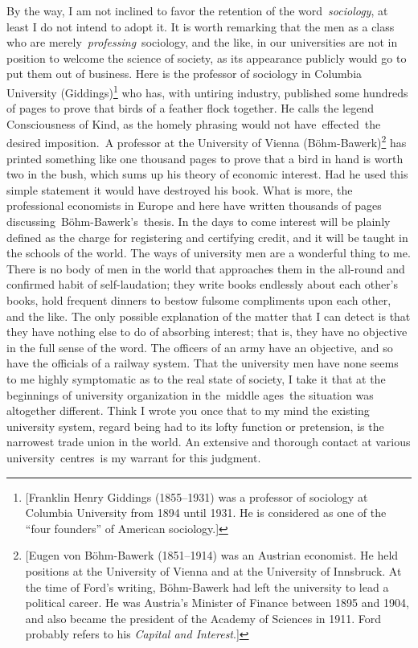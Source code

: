 \documentclass[twoside,symmetric,nobib,justified]{tufte-book}
\begin{document}
By the way, I am not inclined to favor the retention of the
word~\emph{sociology}, at least I do not intend to adopt it. It is worth
remarking that the men as a class who are
merely~\emph{professing}~sociology, and the like, in our universities
are not in position to welcome the science of society, as its appearance
publicly would go to put them out of business. Here is the professor of
sociology in Columbia University (Giddings)\footnote{{[}Franklin Henry
  Giddings (1855--1931) was a professor of sociology at Columbia
  University from 1894 until 1931. He is considered as one of the ``four
  founders'' of American sociology.{]}} who has, with untiring industry,
published some hundreds of pages to prove that birds of a feather flock
together. He calls the legend Consciousness of Kind, as the homely
phrasing would not have~effected~the desired imposition.~A professor at
the University of Vienna (Böhm-Bawerk)\footnote{{[}Eugen von Böhm-Bawerk
  (1851--1914) was an Austrian economist. He held positions at the
  University of Vienna and at the University of Innsbruck. At the time
  of Ford's writing, Böhm-Bawerk had left the university to lead a
  political career. He was Austria's Minister of Finance between 1895
  and 1904, and also became the president of the Academy of Sciences in
  1911. Ford probably refers to his \emph{Capital and Interest}.{]}} has
printed something like one thousand pages to prove that a bird in hand
is worth two in the bush, which sums up his theory of economic interest.
Had he used this simple statement it would have destroyed his book. What
is more, the professional economists in Europe and here have written
thousands of pages discussing~Böhm-Bawerk's~thesis. In the days to come
interest will be plainly defined as the charge for registering and
certifying credit, and it will be taught in the schools of the world.
The ways of university men are a wonderful thing to me. There is no body
of men in the world that approaches them in the all-round and confirmed
habit of self-laudation; they write books endlessly about each other's
books, hold frequent dinners to bestow fulsome compliments upon each
other, and the like. The only possible explanation of the matter that I
can detect is that they have nothing else to do of absorbing interest;
that is, they have no objective in the full sense of the word. The
officers of an army have an objective, and so have the officials of a
railway system. That the university men have none seems to me highly
symptomatic as to the real state of society, I take it that at the
beginnings of university organization in the~middle ages~the situation
was altogether different. Think I wrote you once that to my mind the
existing university system, regard being had to its lofty function or
pretension, is the narrowest trade union in the world. An extensive and
thorough contact at various university~centres~is my warrant for this
judgment.~~
\end{document}
